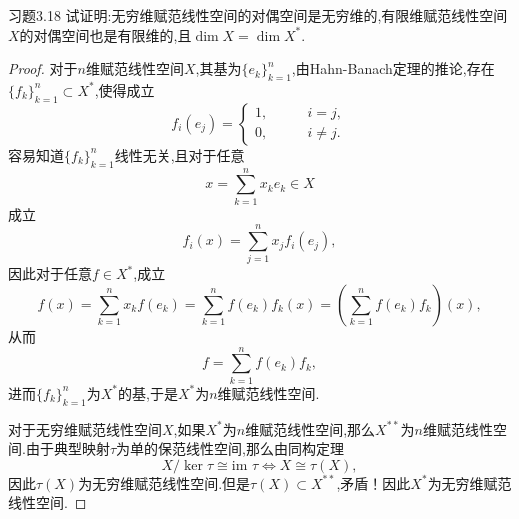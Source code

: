 \documentclass[lang = cn, scheme = chinese]{elegantbook}
\newcommand{\sub}{\subset}             %
\newcommand{\im}{\text{im }}           %
\begin{document}
	\begin{proposition}{习题3.18}
		试证明:无穷维赋范线性空间的对偶空间是无穷维的,有限维赋范线性空间$X$的对偶空间也是有限维的,且$\dim X=\dim X^*$.
	\end{proposition}
	
	\begin{proof}
		对于$n$维赋范线性空间$X$,其基为$\{e_k\}_{k=1}^{n}$,由Hahn-Banach定理的推论,存在$\{f_k\}_{k=1}^{n}\sub X^*$,使得成立
		$$
		f_i(e_j)=\begin{cases}
			1,\qquad & i=j,\\
			0,\qquad & i\ne j.
		\end{cases}
		$$
		容易知道$\{f_k\}_{k=1}^{n}$线性无关,且对于任意
		$$
		x=\sum_{k=1}^{n}x_ke_k\in X
		$$
		成立
		$$
		f_i(x)=\sum_{j=1}^{n}x_jf_i(e_j),
		$$
		因此对于任意$f\in X^*$,成立
		$$
		f(x)=\sum_{k=1}^{n}x_kf(e_k)=\sum_{k=1}^{n}f(e_k)f_k(x)
		=\left(\sum_{k=1}^{n}f(e_k)f_k\right)(x),
		$$
		从而
		$$
		f=\sum_{k=1}^{n}f(e_k)f_k,
		$$
		进而$\{f_k\}_{k=1}^{n}$为$X^*$的基,于是$X^*$为$n$维赋范线性空间.
		
		对于无穷维赋范线性空间$X$,如果$X^*$为$n$维赋范线性空间,那么$X^{**}$为$n$维赋范线性空间.由于典型映射$\tau$为单的保范线性空间,那么由同构定理
		$$
		X/\ker\tau\cong\im\tau\iff X\cong \tau(X),
		$$
		因此$\tau(X)$为无穷维赋范线性空间.但是$\tau(X)\sub X^{**}$,矛盾！因此$X^*$为无穷维赋范线性空间.
	\end{proof}
\end{document}
